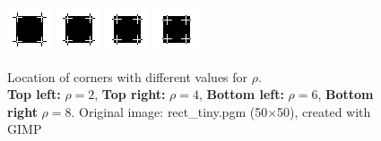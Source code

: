\begin{figure}[h]
    \centering
    \includegraphics[width=0.4\linewidth]{../Images/rect/rect_2_corner.png}
    \includegraphics[width=0.4\linewidth]{../Images/rect/rect_4_corner.png}
    \includegraphics[width=0.4\linewidth]{../Images/rect/rect_6_corner.png}
    \includegraphics[width=0.4\linewidth]{../Images/rect/rect_8_corner.png}
    \caption{Location of corners with different values for $\rho$.\\
\textbf{Top left:} $\rho=2$, \textbf{Top right:} $\rho=4$, \textbf{Bottom left:}
$\rho=6$, \textbf{Bottom right} $\rho=8$. Original image: rect\_tiny.pgm (50$\times$50), created with
GIMP~\cite{gimp}}\label{fig:Integration}
\end{figure}
